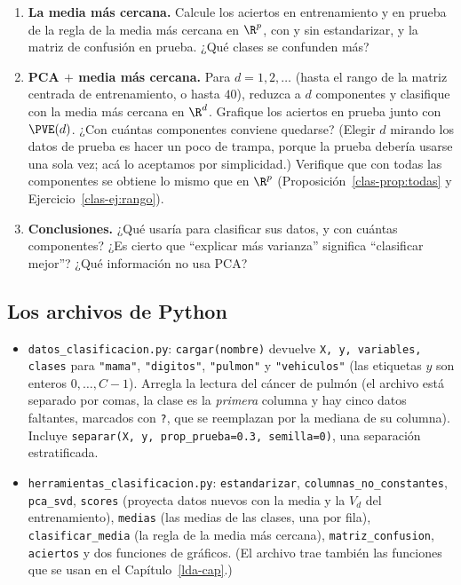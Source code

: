 \begin{enumerate}[leftmargin=*,label=\textbf{P.\arabic*},ref=P.\arabic*,itemsep=6pt]
\item \textbf{La media más cercana.} Calcule los aciertos en entrenamiento y
en prueba de la regla de la media más cercana en $\R^p$, con y sin
estandarizar, y la matriz de confusión en prueba. ¿Qué clases se confunden
más?

\item \textbf{PCA $+$ media más cercana.} Para $d=1,2,\dots$ (hasta el rango
de la matriz centrada de entrenamiento, o hasta $40$), reduzca a $d$
componentes y clasifique con la media más cercana en $\R^d$. Grafique los
aciertos en prueba junto con $\PVE(d)$. ¿Con cuántas componentes conviene
quedarse? (Elegir $d$ mirando los datos de prueba es hacer un poco de trampa,
porque la prueba debería usarse una sola vez; acá lo aceptamos por
simplicidad.) Verifique que con todas las componentes se obtiene lo mismo que
en $\R^p$ (Proposición~\ref{clas-prop:todas} y Ejercicio~\ref{clas-ej:rango}).

\item \textbf{Conclusiones.} ¿Qué usaría para clasificar sus datos, y con
cuántas componentes? ¿Es cierto que ``explicar más varianza'' significa
``clasificar mejor''? ¿Qué información no usa PCA?

\end{enumerate}

\subsection*{Los archivos de Python}

\begin{itemize}[leftmargin=*,itemsep=2pt]
\raggedright
\item \texttt{datos\_clasificacion.py}: \texttt{cargar(nombre)} devuelve
\texttt{X, y, variables, clases} para \texttt{"mama"}, \texttt{"digitos"},
\texttt{"pulmon"} y \texttt{"vehiculos"} (las etiquetas $y$ son enteros
$0,\dots,C-1$). Arregla la lectura del cáncer de pulmón (el archivo está
separado por comas, la clase es la \emph{primera} columna y hay cinco datos
faltantes, marcados con \texttt{?}, que se reemplazan por la mediana de su
columna). Incluye \texttt{separar(X, y, prop\_prueba=0.3, semilla=0)}, una
separación estratificada.
\item \texttt{herramientas\_clasificacion.py}: \texttt{estandarizar},
\texttt{columnas\_no\_constantes}, \texttt{pca\_svd}, \texttt{scores} (proyecta
datos nuevos con la media y la $V_d$ del entrenamiento), \texttt{medias} (las
medias de las clases, una por fila), \texttt{clasificar\_media} (la regla de la
media más cercana), \texttt{matriz\_confusion}, \texttt{aciertos} y dos
funciones de gráficos. (El archivo trae también las funciones que se usan en
el Capítulo~\ref{lda-cap}.)
\end{itemize}


